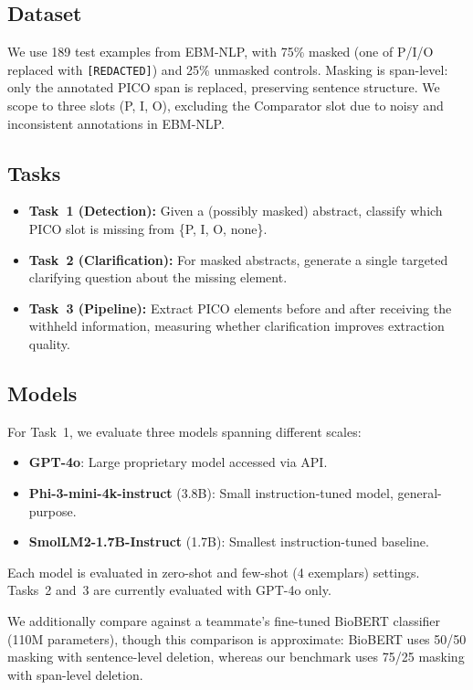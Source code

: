 \documentclass[11pt]{article}
\begin{document}
\subsection{Dataset}

We use 189 test examples from EBM-NLP, with 75\% masked (one of P/I/O replaced with \texttt{[REDACTED]}) and 25\% unmasked controls.
Masking is span-level: only the annotated PICO span is replaced, preserving sentence structure.
We scope to three slots (P, I, O), excluding the Comparator slot due to noisy and inconsistent annotations in EBM-NLP.

\subsection{Tasks}

\begin{itemize}
  \item \textbf{Task~1 (Detection):} Given a (possibly masked) abstract, classify which PICO slot is missing from \{P, I, O, none\}.
  \item \textbf{Task~2 (Clarification):} For masked abstracts, generate a single targeted clarifying question about the missing element.
  \item \textbf{Task~3 (Pipeline):} Extract PICO elements before and after receiving the withheld information, measuring whether clarification improves extraction quality.
\end{itemize}

\subsection{Models}

For Task~1, we evaluate three models spanning different scales:
\begin{itemize}
  \item \textbf{GPT-4o}: Large proprietary model accessed via API.
  \item \textbf{Phi-3-mini-4k-instruct} (3.8B): Small instruction-tuned model, general-purpose.
  \item \textbf{SmolLM2-1.7B-Instruct} (1.7B): Smallest instruction-tuned baseline.
\end{itemize}

Each model is evaluated in zero-shot and few-shot (4 exemplars) settings.
Tasks~2 and~3 are currently evaluated with GPT-4o only.

We additionally compare against a teammate's fine-tuned BioBERT classifier (110M parameters), though this comparison is approximate: BioBERT uses 50/50 masking with sentence-level deletion, whereas our benchmark uses 75/25 masking with span-level deletion.
\end{document}
